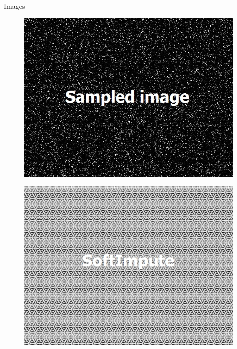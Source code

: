 \documentclass{beamer}
\begin{document}
\begin{frame}{Images}
	\vspace{-0.2cm}
	\begin{multicols}{2}
		\vspace{-0.2cm}
		\begin{figure}[h]
			\centering
			\includegraphics[width=\linewidth]{./../data/images/presentation/with_capture/p1.jpg}
		\end{figure}
		\vspace{-0.2cm}
		\begin{figure}[h]
			\centering
			\includegraphics[width=\linewidth]{./../data/images/presentation/with_capture/p1_1.jpg}
		\end{figure}

\end{multicols}
\end{frame}
\end{document}
